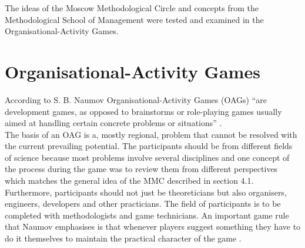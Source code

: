 \documentclass[11pt,a4paper]{article}
\begin{document}
\singlespacing
\noindent The ideas of the Moscow Methodological Circle and concepts from the Methodological School of Management were tested and examined in the Organisational-Activity Games. 


\section{Organisational-Activity Games}
According to S. B. Naumov Organisational-Activity Games (OAGs) “are development games, as opposed to brainstorms or role-playing games usually aimed at handling certain concrete problems or situations” \cite{Naumov}. \\
The basis of an OAG is a, mostly regional, problem that cannot be resolved with the current prevailing potential. The participants should be from different fields of science because most problems involve several disciplines and one concept of the process during the game was to review them from different perspectives which matches the general idea of the MMC described in section 4.1. Furthermore, participants should not just be theoreticians but also organisers, engineers, developers and other practicians. The field of participants is to be completed with methodologists and game technicians. An important game rule that Naumov emphasises is that whenever players suggest something they have to do it themselves to maintain the practical character of the game \cite{Naumov}.
 
\end{document}
